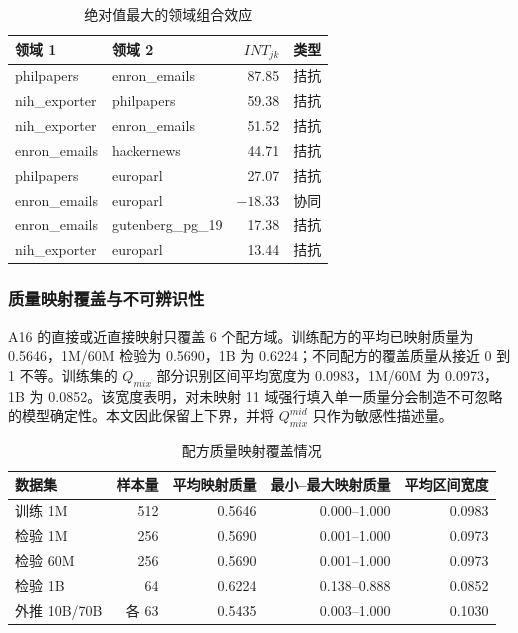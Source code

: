 \documentclass[bwprint]{gmcmthesis}
\begin{document}
        \begin{table}[H]
        \centering
        \caption{绝对值最大的领域组合效应}  %
        \label{tab:interactions}
        \begin{tabular}{llrr}
        \toprule
        领域 1 & 领域 2 & $INT_{jk}$ & 类型 \\
        \midrule
        philpapers & enron\_emails & 87.85 & 拮抗 \\
        nih\_exporter & philpapers & 59.38 & 拮抗 \\
        nih\_exporter & enron\_emails & 51.52 & 拮抗 \\
        enron\_emails & hackernews & 44.71 & 拮抗 \\
        philpapers & europarl & 27.07 & 拮抗 \\
        enron\_emails & europarl & $-18.33$ & 协同 \\
        enron\_emails & gutenberg\_pg\_19 & 17.38 & 拮抗 \\
        nih\_exporter & europarl & 13.44 & 拮抗 \\
        \bottomrule
        \end{tabular}
        \end{table}


        \subsubsection{质量映射覆盖与不可辨识性}    %
        A16 的直接或近直接映射只覆盖 6 个配方域。训练配方的平均已映射质量为 0.5646，1M/60M 检验为 0.5690，1B 为 0.6224；不同配方的覆盖质量从接近 0 到 1 不等。训练集的 $Q_{mix}$ 部分识别区间平均宽度为 0.0983，1M/60M 为 0.0973，1B 为 0.0852。该宽度表明，对未映射 11 域强行填入单一质量分会制造不可忽略的模型确定性。本文因此保留上下界，并将 $Q_{mix}^{mid}$ 只作为敏感性描述量。
        
        \begin{table}[H]
        \centering
        \caption{配方质量映射覆盖情况}    %
        \label{tab:mapping}
        \begin{tabular}{lrrrr}
        \toprule
        数据集 & 样本量 & 平均映射质量 & 最小--最大映射质量 & 平均区间宽度 \\
        \midrule
        训练 1M & 512 & 0.5646 & 0.000--1.000 & 0.0983 \\
        检验 1M & 256 & 0.5690 & 0.001--1.000 & 0.0973 \\
        检验 60M & 256 & 0.5690 & 0.001--1.000 & 0.0973 \\
        检验 1B & 64 & 0.6224 & 0.138--0.888 & 0.0852 \\
        外推 10B/70B & 各 63 & 0.5435 & 0.003--1.000 & 0.1030 \\
        \bottomrule
        \end{tabular}
        \end{table}
\end{document}
